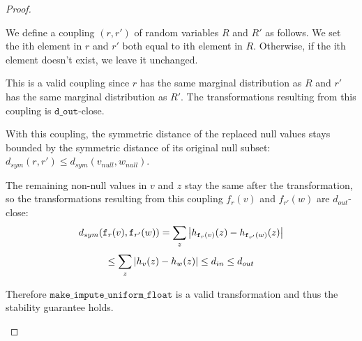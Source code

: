 \documentclass[11pt,a4paper]{article}
\newcommand{\dout}{\texttt{d\_out}}
\begin{document}
\begin{proof}
\begin{enumerate}
    We define a coupling $(r, r')$ of random variables $R$ and $R'$ as follows. We set the ith element in $r$ and $r'$ both equal to ith element in $R$. Otherwise, if the ith element doesn't exist, we leave it unchanged. 

    This is a valid coupling since $r$ has the same marginal distribution as $R$ and $r'$ has the same marginal distribution as $R'$. The transformations resulting from this coupling is $\dout$-close. 

    With this coupling, the symmetric distance of the replaced null values stays bounded by the symmetric distance of its original null subset: $d_{sym}(r, r') \leq d_{sym}(v_{null}, w_{null})$. 
    
    The remaining non-null values in $v$ and $z$ stay the same after the transformation, so the transformations resulting from this coupling $f_r(v)$ and $f_{r'}(w)$ are $d_{out}$-close: $$d_{sym}(\texttt{f}_r(v), \texttt{f}_{r'}(w)) = \sum_z \abs{h_{\texttt{f}_r(v)}(z) - h_{\texttt{f}_{r'}(w)}(z)}$$
    $$\leq \sum_z \abs{h_v(z) - h_w(z)} \leq d_{in} \leq d_{out}$$ 
    
    Therefore $\texttt{make\_impute\_uniform\_float}$ is a valid transformation and thus the stability guarantee holds. 
    


    
\end{enumerate}
\end{proof}
\end{document}

